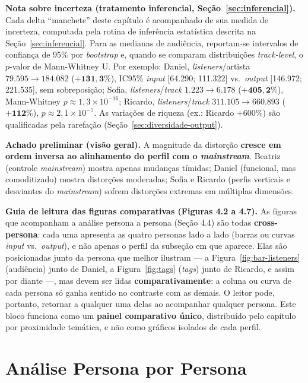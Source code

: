 \documentclass[12pt, %
openright,
oneside, %
a4paper,    %
english,   %
brazil]{facom-ufu-abntex2}
\begin{document}
\textbf{Nota sobre incerteza (tratamento inferencial, Seção~\ref{sec:inferencial}).}
Cada delta ``manchete'' deste capítulo é acompanhado de sua medida de incerteza,
computada pela rotina de inferência estatística descrita na
Seção~\ref{sec:inferencial}. Para as medianas de audiência,
reportam-se intervalos de confiança de 95\% por \emph{bootstrap} e, quando se
comparam distribuições \emph{track-level}, o $p$-valor de Mann-Whitney U. Por
exemplo: Daniel, \emph{listeners}/artista $79.595 \rightarrow 184.082$
($\mathbf{+131{,}3\%}$), IC95\% \emph{input} [64.290; 111.322] vs.\ \emph{output}
[146.972; 221.535], sem sobreposição; Sofia, \emph{listeners}/\emph{track}
$1.223 \rightarrow 6.178$ ($\mathbf{+405{,}2\%}$), Mann-Whitney
$p \approx 1{,}3 \times 10^{-16}$; Ricardo, \emph{listeners}/\emph{track}
$311.105 \rightarrow 660.893$ ($\mathbf{+112\%}$), $p \approx 2{,}1 \times
10^{-7}$. As variações de riqueza (ex.: Ricardo $+600\%$) são qualificadas pela
rarefação (Seção~\ref{sec:diversidade-output}).

\textbf{Achado preliminar (visão geral).} A magnitude da distorção \textbf{cresce
em ordem inversa ao alinhamento do perfil com o \emph{mainstream}}. Beatriz
(controle \emph{mainstream}) mostra apenas mudanças tímidas; Daniel (funcional,
mas comoditizado) mostra distorções moderadas; Sofia e Ricardo (perfis verticais
e desviantes do \emph{mainstream}) sofrem distorções extremas em múltiplas
dimensões.

\noindent\textbf{Guia de leitura das figuras comparativas (Figuras 4.2 a 4.7).}
As figuras que acompanham a análise persona a persona (Seção 4.4)
são todas \textbf{cross-persona}: cada uma apresenta as quatro personas lado a
lado (barras ou curvas \emph{input} vs.\ \emph{output}), e não apenas o perfil da
subseção em que aparece. Elas são posicionadas junto da persona que melhor
ilustram --- a Figura~\ref{fig:bar-listeners} (audiência) junto de Daniel, a
Figura~\ref{fig:tags} (\emph{tags}) junto de Ricardo, e assim por diante ---, mas
devem ser lidas \textbf{comparativamente}: a coluna ou curva de cada persona só
ganha sentido no contraste com as demais. O leitor pode, portanto, retornar a
qualquer uma delas ao acompanhar qualquer persona. Este bloco funciona como um
\textbf{painel comparativo único}, distribuído pelo capítulo por proximidade
temática, e não como gráficos isolados de cada perfil.

\section{Análise Persona por Persona}
\end{document}
